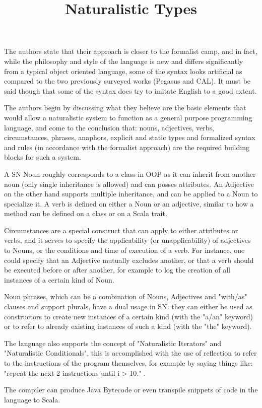 The authors state that their approach is closer to the formalist camp, and in fact, while the philosophy and style of the language is new and differs significantly from a typical object oriented language, some of the syntax looks artificial as compared to the two previously surveyed works (Pegasus and CAL). It must be said though that some of the syntax does try to imitate English to a good extent.

The authors begin by discussing what they believe are the basic elements that would allow a naturalistic system to function as a general purpose programming language, and come to the conclusion that: nouns, adjectives, verbs, circumstances, phrases, anaphors, explicit and static types and formalized syntax and rules (in accordance with the formalist approach) are the required building blocks for such a system.

A SN Noun roughly corresponds to a class in OOP as it can inherit from another noun (only single inheritance is allowed) and can posses attributes. An Adjective on the other hand supports multiple inheritance, and can be applied to a Noun to specialize it. A verb is defined on either a Noun or an adjective, similar to how a method can be defined on a class or on a Scala trait.

Circumstances are a special construct that can apply to either attributes or verbs, and it serves to specify the applicability (or unapplicability) of adjectives to Nouns, or the conditions and time of execution of a verb. For instance, one could specify that an Adjective mutually excludes another, or that a verb should be executed before or after another, for example to log the creation of all instances of a certain kind of Noun.

Noun phrases, which can be a combination of Nouns, Adjectives and "with/as" clauses and support plurals, have a dual usage in SN: they can either be used as constructors to create new instances of a certain kind (with the "a/an" keyword) or to refer to already existing instances of such a kind (with the "the" keyword).

The language also supports the concept of "Naturalistic Iterators" and "Naturalistic Conditionals", this is accomplished with the use of reflection to refer to the instructions of the program themselves, for example by saying things like: "repeat the next 2 instructions until i > 10." \cite{pulido2019model}.

The compiler can produce Java Bytecode or even transpile snippets of code in the language to Scala.

\title{ Naturalistic Types}


